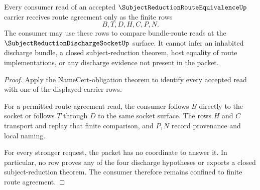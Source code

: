 \begin{theorem}
\label{thm:subject-reduction-route-equivalence-consumer-nonescape}
Every consumer read of an accepted $\SubjectReductionRouteEquivalenceUp$ carrier receives route agreement only as the finite rows
$$
B,T,D,H,C,P,N.
$$
The consumer may use these rows to compare bundle-route reads at the $\SubjectReductionDischargeSocketUp$ surface. It cannot infer an inhabited discharge bundle, a closed subject-reduction theorem, host equality of route implementations, or any discharge evidence not present in the packet.
\end{theorem}
\begin{proof}
Apply the NameCert-obligation theorem to identify every accepted read with one of the displayed carrier rows.

For a permitted route-agreement read, the consumer follows $B$ directly to the socket or follows $T$ through $D$ to the same socket surface. The rows $H$ and $C$ transport and replay that finite comparison, and $P,N$ record provenance and local naming.

For every stronger request, the packet has no coordinate to answer it. In particular, no row proves any of the four discharge hypotheses or exports a closed subject-reduction theorem. The consumer therefore remains confined to finite route agreement.
\end{proof}


\begin{closurestatus}{\SubjectReductionRouteEquivalenceUp}
  \theoryclosure{\seedClosure}
  \formalstatus{\unformalizedV}
\end{closurestatus}
